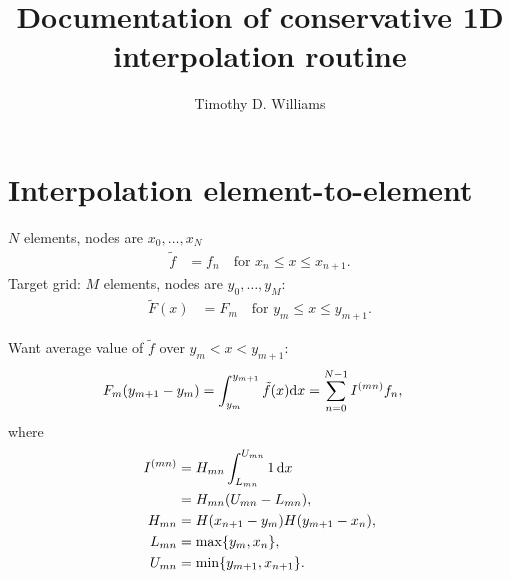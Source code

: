 \documentclass[a4paper,10pt]{article}
\title{Documentation of conservative 1D interpolation routine}
\author{Timothy D. Williams}
\def\rmd{{\rm d}}
\begin{document}
\maketitle

\section{Interpolation element-to-element}
$N$ elements, nodes are $x_0,\ldots,x_N$
\begin{subequations}
\begin{align}
\tilde f&=f_n\quad\text{for $x_n\leq x\leq x_{n+1}$}.
\end{align}
\end{subequations}
Target grid: $M$ elements, nodes are $y_0,\ldots,y_M$:
\begin{align}
\tilde F(x)&=F_m\quad\text{for $y_m\leq x\leq y_{m+1}$}.
\end{align}

Want average value of $\tilde f$ over $y_m<x<y_{m+1}$:
\begin{align}
F_m(y_{m+1}-y_m)
&=\int_{y_m}^{y_{m+1}}\tilde f(x)\rmd x%
=\sum_{n=0}^{N-1}
I^{(mn)}f_n,
\end{align}
where
\begin{subequations}
\begin{align}
I^{(mn)}&=H_{mn}\int_{L_{mn}}^{U_{mn}}1\,\rmd x\notag\\
&=H_{mn}(U_{mn}-L_{mn}),\\
H_{mn}&=H(x_{n+1}-y_m)H(y_{m+1}-x_n),\\
L_{mn}&=\max\{y_m,x_n\},\\
U_{mn}&=\min\{y_{m+1},x_{n+1}\}.
\end{align}
\end{subequations}
\end{document}
